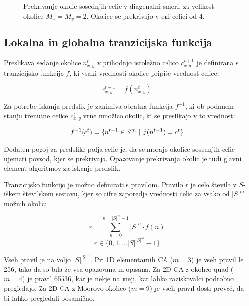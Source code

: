 \documentclass[12pt,a4paper,openany,twoside]{book}
\begin{document}
\begin{figure}[htb]
\centerline{}
\caption[Prekrivanje okolic \(2 \times 2\) - diagonalno.]
{Prekrivanje okolic sosednjih celic v diagonalni smeri, za velikost okolice \(M_x=M_y=2\).
Okolice se prekrivajo v eni celici od 4.}
\label{overlap_diagonal_quad}
\end{figure}

\subsection{Lokalna in globalna tranzicijska funkcija}

Preslikava sedanje okolice \(n_{x,y}^{t}\) v prihodnjo istoležno celico \(c_{x,y}^{t+1}\) je definirana
s tranzicijsko funkcijo \(f\), ki vsaki vrednosti okolice pripiše vrednost celice:

\begin{equation}
c_{x,y}^{t+1} = f(n_{x,y}^{t})
\end{equation}

Za potrebe iskanja predslik je zanimiva obratna funkcija \(f^{-1}\), ki ob
podanem stanju trenutne celice \(c_{x,y}^{t}\) vrne množico okolic,
ki se preslikajo v to vrednost:

\begin{equation}
f^{-1}(c^{t}) = \{ n^{t-1} \in S^m \ \arrowvert \ f(n^{t-1}) = c^{t} \}
\end{equation}

Dodaten pogoj za predslike polja celic je, da se morajo okolice sosednjih celic
ujemati povsod, kjer se prekrivajo.
Opazovanje prekrivanja okolic je tudi glavni element algoritmov za iskanje predslik.

Tranzicijsko funkcijo je možno definirati s pravilom.
Pravilo \(r\) je celo število v \(S\)-iškem številskem sestavu,
kjer so cifre zaporedje vrednosti celic za vsako od \(|S|^m\) možnih okolic:

\begin{equation}
r = \sum_{n=0}^{n=|S|^m-1} |S|^n \cdot f(n)
\end{equation}
\begin{equation}
r \in \{0, 1, \ldots |S|^{|S|^m}-1\}
\end{equation}

Vseh pravil je na voljo \(|S|^{|S|^m}\).
Pri 1D elementarnih CA (\(m=3\)) je vseh pravil le 256, tako da so bila že vsa opazovana in opisana.
Za 2D CA z okolico quad (\(m=4\)) je pravil 65536, kar je nekje na meji, kar lahko raziskovalci podrobno pregledajo.
Za 2D CA z Moorovo okolico (\(m=9\)) je vseh pravil dosti preveč, da bi lahko pregledali posamično.
\end{document}
